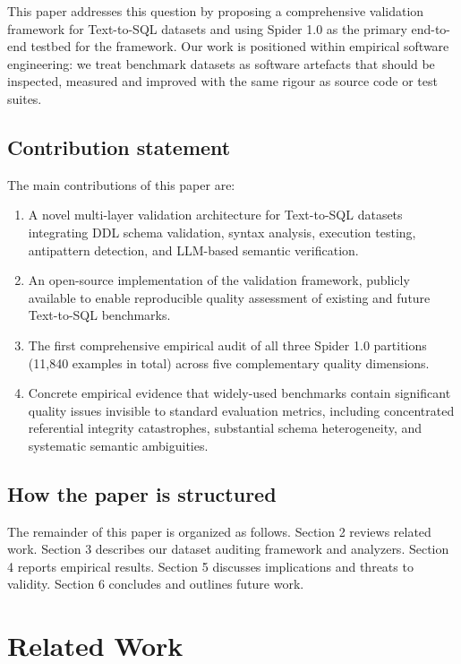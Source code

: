 \documentclass[]{einformatica}
\begin{document}
This paper addresses this question by proposing a comprehensive validation framework for Text-to-SQL datasets and using Spider 1.0 as the primary end-to-end testbed for the framework. Our work is positioned within empirical software engineering: we treat benchmark datasets as software artefacts that should be inspected, measured and improved with the same rigour as source code or test suites.

\subsection*{Contribution statement}

The main contributions of this paper are:

\begin{enumerate}
\item A novel multi-layer validation architecture for Text-to-SQL datasets integrating DDL schema validation, syntax analysis, execution testing, antipattern detection, and LLM-based semantic verification.
\item An open-source implementation of the validation framework, publicly available to enable reproducible quality assessment of existing and future Text-to-SQL benchmarks.
\item The first comprehensive empirical audit of all three Spider 1.0 partitions (11,840 examples in total) across five complementary quality dimensions.
\item Concrete empirical evidence that widely-used benchmarks contain significant quality issues invisible to standard evaluation metrics, including concentrated referential integrity catastrophes, substantial schema heterogeneity, and systematic semantic ambiguities.
\end{enumerate}

\subsection*{How the paper is structured}

The remainder of this paper is organized as follows. Section 2 reviews related work. Section 3 describes our dataset auditing framework and analyzers. Section 4 reports empirical results. Section 5 discusses implications and threats to validity. Section 6 concludes and outlines future work.

\section{Related Work}\label{sec:RelatedWork}
\end{document}
